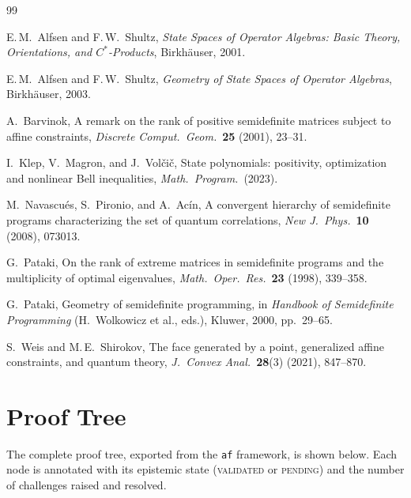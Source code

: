 \documentclass[11pt,a4paper]{article}
\theoremstyle{plain}
\theoremstyle{definition}
\theoremstyle{remark}
\begin{document}
\begin{thebibliography}{99}

E.\,M.\ Alfsen and F.\,W.\ Shultz,
\emph{State Spaces of Operator Algebras: Basic Theory, Orientations,
and $C^*$-Products},
Birkh\"auser, 2001.

E.\,M.\ Alfsen and F.\,W.\ Shultz,
\emph{Geometry of State Spaces of Operator Algebras},
Birkh\"auser, 2003.

A.\ Barvinok,
A remark on the rank of positive semidefinite matrices subject to
affine constraints,
\emph{Discrete Comput.\ Geom.}\ \textbf{25} (2001), 23--31.

I.\ Klep, V.\ Magron, and J.\ Vol\v{c}i\v{c},
State polynomials: positivity, optimization and nonlinear Bell
inequalities,
\emph{Math.\ Program.}\ (2023).

M.\ Navascu\'es, S.\ Pironio, and A.\ Ac\'in,
A convergent hierarchy of semidefinite programs characterizing the
set of quantum correlations,
\emph{New J.\ Phys.}\ \textbf{10} (2008), 073013.

G.\ Pataki,
On the rank of extreme matrices in semidefinite programs and the
multiplicity of optimal eigenvalues,
\emph{Math.\ Oper.\ Res.}\ \textbf{23} (1998), 339--358.

G.\ Pataki,
Geometry of semidefinite programming,
in \emph{Handbook of Semidefinite Programming} (H.\ Wolkowicz et al.,
eds.), Kluwer, 2000, pp.\ 29--65.

S.\ Weis and M.\,E.\ Shirokov,
The face generated by a point, generalized affine constraints, and
quantum theory,
\emph{J.\ Convex Anal.}\ \textbf{28}(3) (2021), 847--870.

\end{thebibliography}


\newpage
\appendix

\section{Proof Tree}
\label{app:proof-tree}

The complete proof tree, exported from the \texttt{af} framework, is
shown below. Each node is annotated with its epistemic state
(\textsc{validated} or \textsc{pending}) and the number of challenges
raised and resolved.
\end{document}
